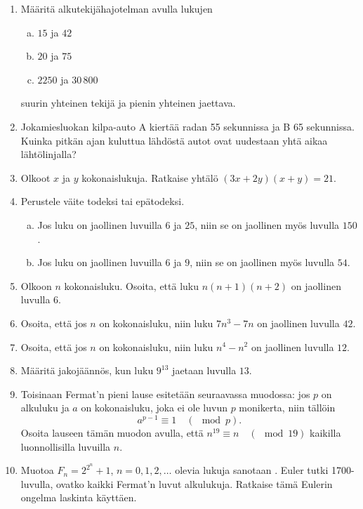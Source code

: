 \begin{enumerate}
\item Määritä alkutekijähajotelman avulla lukujen
\begin{enumerate}[a)]
\item $15$ ja $42$
\item $20$ ja $75$
\item $2250$ ja $30\,800$
\end{enumerate}
suurin yhteinen tekijä ja pienin yhteinen jaettava.

\item
Jokamiesluokan kilpa-auto A kiertää radan 55 sekunnissa ja B
65 sekunnissa. Kuinka pitkän ajan kuluttua lähdöstä autot ovat
uudestaan yhtä aikaa lähtölinjalla?

\item Olkoot $x$ ja $y$ kokonaislukuja. Ratkaise yhtälö $(3x+2y)
(x+y)=21$.

\item Perustele väite todeksi tai epätodeksi.
\begin{enumerate}[a)]
\item Jos luku on jaollinen luvuilla $6$ ja $25$, niin se on
jaollinen myös luvulla $150$.
\item Jos luku on jaollinen luvuilla $6$ ja $9$, niin se on
jaollinen myös luvulla $54$.
\end{enumerate}

\item Olkoon $n$ kokonaisluku. Osoita, että luku $n(n+1)(n+2)$ on
jaollinen luvulla $6$.

\item Osoita, että jos $n$ on kokonaisluku, niin luku $7n^3 - 7n$
on jaollinen luvulla $42$.

\item Osoita, että jos $n$ on kokonaisluku, niin luku $n^4 - n^2$
on jaollinen luvulla $12$.

\item
Määritä jakojäännös, kun luku $9^{13}$ jaetaan luvulla $13$.

\item Toisinaan Fermat'n pieni lause esitetään seuraavassa
muodossa:
jos $p$ on alkuluku ja $a$ on kokonaisluku, joka ei ole
luvun $p$ monikerta, niin tällöin
\[
a^{p-1}\equiv 1\quad (\mod p).
\]
Osoita lauseen tämän muodon avulla, että $n^{19}\equiv n \quad
(\mod 19)$ kaikilla luonnollisilla luvuilla $n$.

\item
Muotoa $F_n = 2^{2^n}+1$, $n=0,1,2,\ldots$ olevia lukuja sanotaan
. Euler tutki 1700-luvulla, ovatko kaikki
Fermat'n luvut alkulukuja. Ratkaise tämä Eulerin ongelma laskinta
käyttäen.


\end{enumerate}
